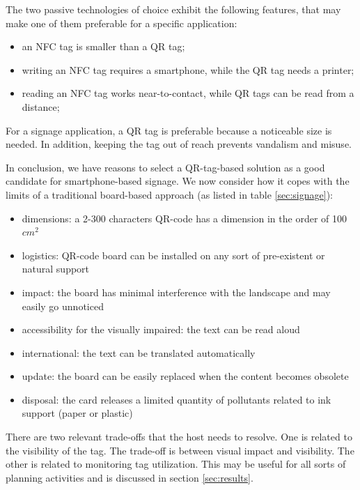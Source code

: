 \documentclass[sustainability,article,submit,pdftex,moreauthors]{Definitions/mdpi}
\begin{document}
The two passive technologies of choice exhibit the following features, that may make one of them preferable for a specific application:

\begin{itemize}
	\item an NFC tag is smaller than a QR tag;
	\item writing an NFC tag requires a smartphone, while the QR tag needs a printer;
	\item reading an NFC tag works near-to-contact, while QR tags can be read from a distance;
\end{itemize}


For a signage application, a QR tag is preferable because a noticeable size is needed. In addition, keeping the tag out of reach prevents vandalism and misuse.  

In conclusion, we have reasons to select a QR-tag-based solution as a good candidate for smartphone-based signage. We now consider how it copes with the limits of a traditional board-based approach (as listed in table \ref{sec:signage}):

\begin{itemize}
	\item dimensions: a 2-300 characters QR-code has a dimension in the order of 100 $cm^2$
	\item logistics: QR-code board can be installed on any sort of pre-existent or natural support
	\item impact: the board has minimal interference with the landscape and may easily go unnoticed
	\item accessibility for the visually impaired: the text can be read aloud
	\item international: the text can be translated automatically
	\item update: the board can be easily replaced when the content becomes obsolete
	\item disposal: the card releases a limited quantity of pollutants related to ink support (paper or plastic)
\end{itemize}
		
There are two relevant trade-offs that the host needs to resolve. One is related to the visibility of the tag. The trade-off is between visual impact and visibility. The other is related to monitoring tag utilization. This may be useful for all sorts of planning activities and is discussed in section \ref{sec:results}.
\end{document}
